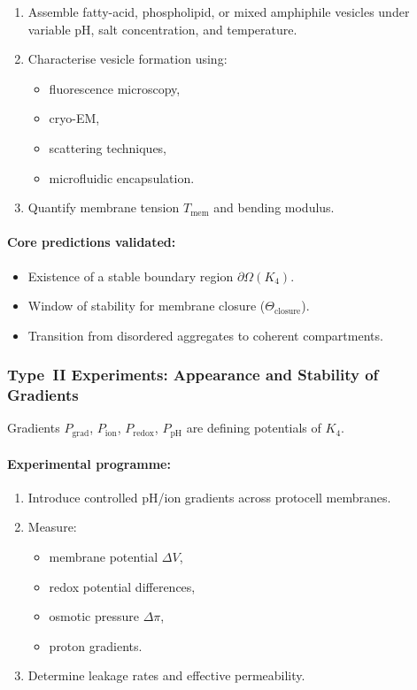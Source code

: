 \begin{enumerate}
    \item Assemble fatty-acid, phospholipid, or mixed amphiphile vesicles 
          under variable pH, salt concentration, and temperature.
    \item Characterise vesicle formation using:
          \begin{itemize}
              \item fluorescence microscopy,
              \item cryo-EM,
              \item scattering techniques,
              \item microfluidic encapsulation.
          \end{itemize}
    \item Quantify membrane tension $T_{\mathrm{mem}}$ and bending modulus.
\end{enumerate}

\paragraph{Core predictions validated:}

\begin{itemize}
    \item Existence of a stable boundary region $\partial\Omega(K_4)$.
    \item Window of stability for membrane closure 
          ($\Theta_{\mathrm{closure}}$).
    \item Transition from disordered aggregates to coherent compartments.
\end{itemize}



\subsubsection{Type~II Experiments: Appearance and Stability of Gradients}

Gradients $P_{\mathrm{grad}}$, $P_{\mathrm{ion}}$, 
$P_{\mathrm{redox}}$, $P_{\mathrm{pH}}$ are defining potentials of $K_4$.

\paragraph{Experimental programme:}

\begin{enumerate}
    \item Introduce controlled pH/ion gradients across protocell membranes.
    \item Measure:
          \begin{itemize}
              \item membrane potential $\Delta V$,
              \item redox potential differences,
              \item osmotic pressure $\Delta\pi$,
              \item proton gradients.
          \end{itemize}
    \item Determine leakage rates and effective permeability.
\end{enumerate}


